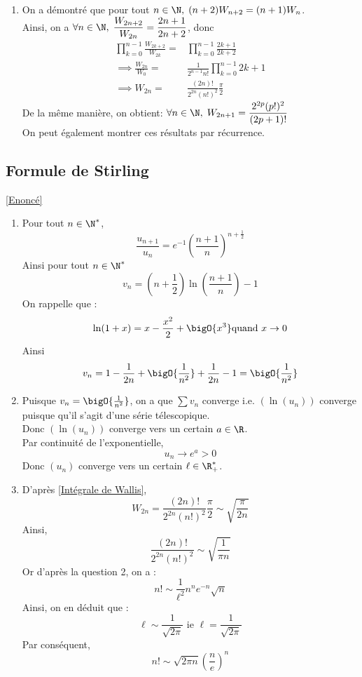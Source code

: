 \documentclass{book}
\begin{document}
\begin{enumerate}[leftmargin=*]
		\item On a démontré que pour tout $n\in\N, \; (n+2)W_{n+2}=(n+1)W_n$.
		\\Ainsi, on a $\forall n\in\N, \; \displaystyle\frac{W_{2n+2}}{W_{2n}}=\frac{2n+1}{2n+2}$, donc \begin{align*}
			\displaystyle\prod\limits_{k=0}^{n-1}\frac{W_{2k+2}}{W_{2k}}=&\prod\limits_{k=0}^{n-1}\frac{2k+1}{2k+2}\\
			\implies\frac{W_{2n}}{W_{0}}=&\frac{1}{2^{n-1}n!}\prod\limits_{k=0}^{n-1}2k+1\\
			\implies W_{2n}=&\frac{(2n)!}{2^{2n}(n!)^2}\frac{\pi}{2}
		\end{align*}
		De la même manière, on obtient: $\forall n\in\N,\; W_{2n+1}=\displaystyle\frac{2^{2p}(p!)^2}{(2p+1)!}$
		\\On peut également montrer ces résultats par récurrence.
	\end{enumerate}
	
	\subsection{Formule de Stirling}
	\label{Formule de Stirling corrgié}
	\textcolor{blue}{\hyperref[stirling]{[Enoncé]}}\\
	\begin{enumerate}[leftmargin=*]
		\item Pour tout $n\in\N^*$, \[\frac{u_{n+1}}{u_n}=e^{-1}\left(\frac{n+1}{n}\right)^{n+\tfrac{1}{2}}\]
		Ainsi pour tout $n\in\N^*$\[v_n=\left(n+\frac{1}{2}\right)\ln\left(\frac{n+1}{n}\right)-1\]
		On rappelle que : 
		\[\ln(1+x)=x-\frac{x^2}{2}+\bigO{x^3} \text{quand }x\rightarrow 0\]
		Ainsi \[v_n=1-\frac{1}{
		2n}+\bigO{\frac{1}{n^2}}+\frac{1}{2n}-1=\bigO{\frac{1}{n^2}}\]
		\item Puisque $v_n=\bigO{\frac{1}{n^2}}$, on a que $\sum v_n$ converge i.e. $(\ln(u_n))$ converge puisque qu'il s'agit d'une série télescopique.\\
		Donc $(\ln(u_n))$ converge vers un certain $a\in\R$.\\
		Par continuité de l'exponentielle, \[u_n\rightarrow e^a>0\]
		Donc $(u_n)$ converge vers un certain $\ell\in\R^*_+$.
		\item D'après \ref{Intégrale de Wallis}, 
		\[W_{2n}=\frac{(2n)!}{2^{2n}(n!)^2}\frac{\pi}{2}\sim\sqrt{\frac{\pi}{2n}}\]
		Ainsi, \[\frac{(2n)!}{2^{2n}(n!)^2}\sim\sqrt{\frac{1}{\pi n}}\]
		Or d'après la question 2, on a :
		\[n!\sim \frac{1}{\ell^2}n^ne^{-n}\sqrt{n}\]
		Ainsi, on en déduit que : \[\ell\sim\frac{1}{\sqrt{2\pi}}\text{ ie } \ell=\frac{1}{\sqrt{2\pi}}\]
		Par conséquent, \[n!\sim \sqrt{2\pi n}\left(\frac{n}{e}\right)^n\]
	\end{enumerate}
\end{document}
